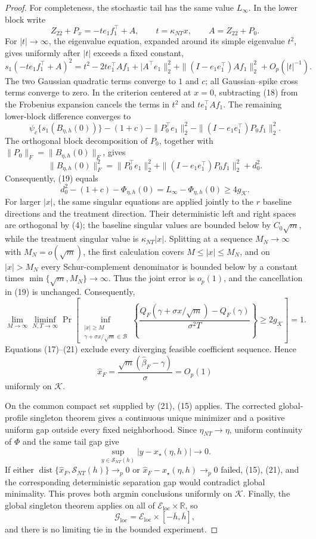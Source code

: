 \documentclass{article}
\begin{document}
\begin{proof}
For completeness, the stochastic tail has the same value \(L_\infty\).  In the lower block write
\[
 Z_{22}+P_x=-t e_1f_1^{\top}+A,
 \qquad t=\kappa_{NT}x,
 \qquad A=Z_{22}+P_0.
\]
For \(|t|\to\infty\), the eigenvalue equation, expanded around its simple eigenvalue \(t^2\), gives uniformly after \(|t|\) exceeds a fixed constant,
\[
 s_1(-t e_1f_1^{\top}+A)^2
 =t^2-2t e_1^{\top}Af_1+|A^{\top}e_1\|_2^2
 +\|(I-e_1e_1^{\top})Af_1\|_2^2+O_p(|t|^{-1}). \tag{18}
\]
The two Gaussian quadratic terms converge to \(1\) and \(c\); all Gaussian--spike cross terms converge to zero.  In the criterion centered at \(x=0\), subtracting (18) from the Frobenius expansion cancels the terms in \(t^2\) and \(t e_1^{\top}Af_1\).  The remaining lower-block difference converges to
\[
 \psi_c\{s_1(B_{\eta,h}(0))\}-(1+c)
 -\|P_0^{\top}e_1\|_2^2
 -\|(I-e_1e_1^{\top})P_0f_1\|_2^2. \tag{19}
\]
The orthogonal block decomposition of \(P_0\), together with \(\|P_0\|_F=\|B_{\eta,h}(0)\|_F\), gives
\[
 \|B_{\eta,h}(0)\|_F^2
 =\|P_0^{\top}e_1\|_2^2
 +\|(I-e_1e_1^{\top})P_0f_1\|_2^2+d_0^2.
\]
Consequently, (19) equals
\[
 d_0^2-(1+c)-\Phi_{\eta,h}(0)
 =L_\infty-\Phi_{\eta,h}(0)\geq4g_{\mathcal K}. \tag{20}
\]
For larger \(|x|\), the same singular equations are applied jointly to the \(r\) baseline directions and the treatment direction.  Their deterministic left and right spaces are orthogonal by (4); the baseline singular values are bounded below by \(C_0\sqrt m\), while the treatment singular value is \(\kappa_{NT}|x|\).  Splitting at a sequence \(M_N\to\infty\) with \(M_N=o(\sqrt m)\), the first calculation covers \(M\leq|x|\leq M_N\), and on \(|x|>M_N\) every Schur-complement denominator is bounded below by a constant times \(\min\{\sqrt m,M_N\}\to\infty\).  Thus the joint error is \(o_p(1)\), and the cancellation in (19) is unchanged.  Consequently,
\[
 \lim_{M\to\infty}\liminf_{N,T\to\infty}
 \Pr\!\left[
 \inf_{\substack{|x|\geq M\\ \gamma+\sigma x/\sqrt m\in\mathcal B}}
 \left\{
 \frac{Q_F(\gamma+\sigma x/\sqrt m)-Q_F(\gamma)}{\sigma^2T}
 \right\}\geq2g_{\mathcal K}
 \right]=1. \tag{21}
\]
Equations (17)--(21) exclude every diverging feasible coefficient sequence.  Hence
\[
 \widehat x_F=\frac{\sqrt m(\widehat\beta_F-\gamma)}\sigma=O_p(1) \tag{22}
\]
uniformly on \(\mathcal K\).

On the common compact set supplied by (21), (15) applies.  The corrected global-profile singleton theorem gives a continuous unique minimizer and a positive uniform gap outside every fixed neighborhood.  Since \(\eta_{NT}\to\eta\), uniform continuity of \(\Phi\) and the same tail gap give
\[
 \sup_{y\in\mathcal S_{NT}(h)}|y-x_\star(\eta,h)|\longrightarrow0. \tag{23}
\]
If either \(\operatorname{dist}\{\widehat x_F,\mathcal S_{NT}(h)\}\to_p0\) or \(\widehat x_F-x_\star(\eta,h)\to_p0\) failed, (15), (21), and the corresponding deterministic separation gap would contradict global minimality.  This proves both argmin conclusions uniformly on \(\mathcal K\).  Finally, the global singleton theorem applies on all of \(\mathcal E_{\mathrm{loc}}\times\mathbb R\), so
\[
 \mathcal G_{\mathrm{loc}}=
 \mathcal E_{\mathrm{loc}}\times[-\overline h,\overline h],
\]
and there is no limiting tie in the bounded experiment.
\end{proof}
\end{document}
